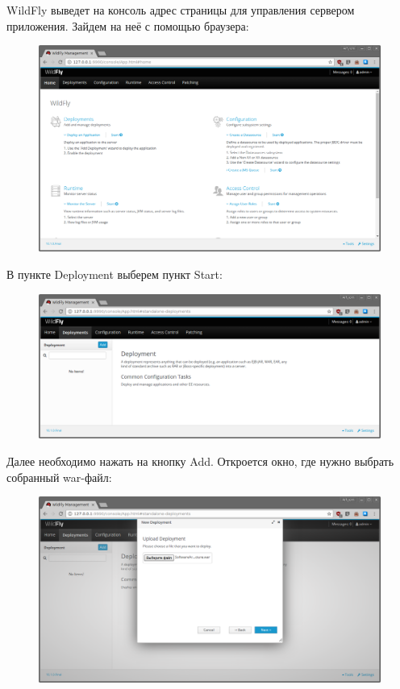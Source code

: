 WildFly выведет на консоль адрес страницы для управления сервером приложения. Зайдем на неё с помощью браузера:

\begin{figure}[H]
\centering
\includegraphics[width=\textwidth]{wildfly.png}
\caption{}
\end{figure}

В пункте Deployment выберем пункт Start:

\begin{figure}[H]
\centering
\includegraphics[width=\textwidth]{wildfly2.png}
\caption{}
\end{figure}

Далее необходимо нажать на кнопку Add. Откроется окно, где нужно выбрать собранный war-файл:

\begin{figure}[H]
\centering
\includegraphics[width=\textwidth]{wildfly3.png}
\caption{}
\end{figure}

